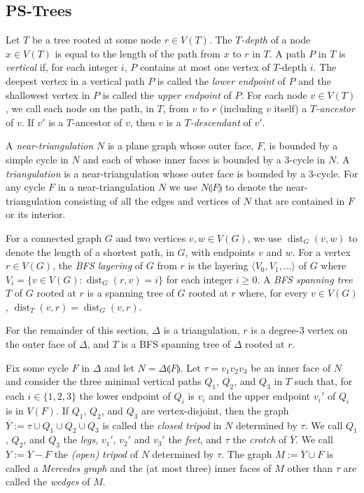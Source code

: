 \documentclass{patmorin}
\DeclareMathOperator{\dist}{dist}
\begin{document}
\subsection{PS-Trees}

Let $T$ be a tree rooted at some node $r\in V(T)$. The \emph{$T$-depth} of a node $x\in V(T)$ is equal to the length of the path from $x$ to $r$ in $T$. A path $P$ in $T$ is \emph{vertical} if, for each integer $i$, $P$ contains at most one vertex of $T$-depth $i$.  The deepest vertex in a vertical path $P$ is called  the \emph{lower endpoint} of $P$ and the shallowest vertex in $P$ is called the \emph{upper endpoint} of $P$. For each node $v\in V(T)$, we call each node on the path, in $T$, from $v$ to $r$ (including $v$ itself) a \emph{$T$-ancestor} of $v$.  If $v'$ is a $T$-ancestor of $v$, then $v$ is a \emph{$T$-descendant} of $v'$.

A \emph{near-triangulation} $N$ is a plane graph whose outer face, $F$, is bounded by a simple cycle in $N$ and each of whose inner faces is bounded by a 3-cycle in $N$.  A \emph{triangulation} is a near-triangulation whose outer face is bounded by a 3-cycle.  For any cycle $F$ in a near-triangulation $N$ we use $N\llparenthesis F\rrparenthesis$ to denote the near-triangulation consisting of all the edges and vertices of $N$ that are contained in $F$ or its interior.

For a connected graph $G$ and two vertices $v,w\in V(G)$, we use $\dist_{G}(v,w)$ to denote the length of a shortest path, in $G$, with endpoints $v$ and $w$.  For a vertex $r\in V(G)$, the \emph{BFS layering} of $G$ from $r$ is the layering $\langle V_0,V_1,\ldots\rangle$ of $G$ where $V_i=\{v\in V(G): \dist_{G}(r,v)=i\}$ for each integer $i\ge 0$.  A \emph{BFS spanning tree} $T$ of $G$ rooted at $r$ is a spanning tree of $G$ rooted at $r$ where, for every $v\in V(G)$, $\dist_T(v,r)=\dist_G(v,r)$.

For the remainder of this section, $\Delta$ is a triangulation, $r$ is a degree-3 vertex on the outer face of $\Delta$, and $T$ is a BFS spanning tree of $\Delta$ rooted at $r$.

Fix some cycle $F$ in $\Delta$ and let $N=\Delta\llparenthesis F\rrparenthesis$.
Let $\tau=v_1v_2v_3$ be an inner face of $N$ and consider the three minimal vertical paths $Q_1$, $Q_2$, and $Q_3$ in $T$ such that, for each $i\in\{1,2,3\}$ the lower endpoint of $Q_i$ is $v_i$ and the upper endpoint $v_i'$ of $Q_i$ is in $V(F)$.  If $Q_1$, $Q_2$, and $Q_3$ are vertex-disjoint, then the graph $\overline{Y}:=\tau\cup Q_1\cup Q_2\cup Q_3$ is called the \emph{closed tripod} in $N$ determined by $\tau$.  We call $Q_1$, $Q_2$, and $Q_3$ the \emph{legs}, $v_1'$, $v_2'$ and $v_3'$ the \emph{feet}, and $\tau$ the \emph{crotch} of $\overline{Y}$.  We call $Y:=\overline{Y}-F$ the \emph{(open) tripod} of $N$ determined by $\tau$.  The graph $M:=\overline{Y}\cup F$ is called a \emph{Mercedes graph} and the (at most three) inner faces of $M$ other than $\tau$ are called the \emph{wedges} of $M$.
\end{document}
